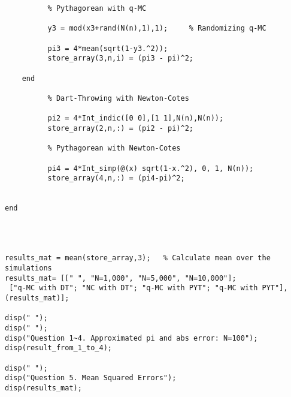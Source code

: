 \documentclass[10pt, letterpaper]{article}
\begin{document}
\begin{verbatim}
          % Pythagorean with q-MC
        
          y3 = mod(x3+rand(N(n),1),1);     % Randomizing q-MC 
         
          pi3 = 4*mean(sqrt(1-y3.^2));
          store_array(3,n,i) = (pi3 - pi)^2;
          
    end
    
          % Dart-Throwing with Newton-Cotes
           
          pi2 = 4*Int_indic([0 0],[1 1],N(n),N(n));     
          store_array(2,n,:) = (pi2 - pi)^2;
          
          % Pythagorean with Newton-Cotes

          pi4 = 4*Int_simp(@(x) sqrt(1-x.^2), 0, 1, N(n));
          store_array(4,n,:) = (pi4-pi)^2;
          
          
end



                   
results_mat = mean(store_array,3);   % Calculate mean over the simulations
results_mat= [[" ", "N=1,000", "N=5,000", "N=10,000"];
 ["q-MC with DT"; "NC with DT"; "q-MC with PYT"; "q-MC with PYT"], (results_mat)];

disp(" ");
disp(" ");
disp("Question 1~4. Approximated pi and abs error: N=100");
disp(result_from_1_to_4);

disp(" ");
disp("Question 5. Mean Squared Errors");
disp(results_mat);

\end{verbatim}
                     
\end{document}
